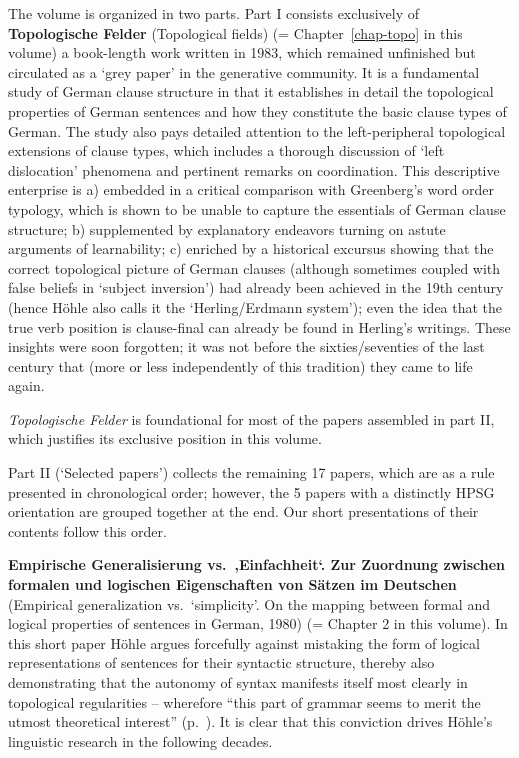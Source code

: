 \begin{refsection}
\medskip
The volume is organized in two parts. Part I consists exclusively of \textbf{Topologische Felder} (Topological fields) (=
Chapter~\ref{chap-topo} in this volume) a book-length work written in 1983, which remained unfinished but circulated as a `grey paper' in the generative community. It is a fundamental study of German clause structure in that it establishes in detail the topological properties of German sentences and how they constitute the basic clause types of German. The study also pays detailed attention to the left-peripheral topological extensions of clause types, which includes a thorough discussion of `left dislocation' phenomena and pertinent remarks on coordination. This descriptive enterprise is a) embedded in a critical comparison with Greenberg's word order typology, which is shown to be unable to capture the essentials of German clause structure; b) supplemented by explanatory endeavors turning on astute arguments of learnability; c) enriched by a historical excursus showing that the correct topological picture of German clauses (although sometimes coupled with false beliefs in `subject inversion') had already been achieved in the 19th century (hence Höhle also calls it the `Herling/Erdmann system'); even the idea that the true verb position is clause-final can already be found in Herling's writings. These insights were soon forgotten; it was not before the sixties/seventies of the last century that (more or less independently of this tradition) they came to life again.

\emph{Topologische Felder} is foundational for most of the papers assembled in part II, which justifies its exclusive position in this volume. 

\medskip
Part II (`Selected papers') collects the remaining 17 papers, which are as a rule
presented in chronological order; however, the 5 papers with a distinctly HPSG orientation are grouped together at the end. Our short presentations of their contents follow this order.  

\textbf{Empirische Generalisierung vs.\ ,Einfachheit‘. Zur Zuordnung zwischen formalen und
  logischen Eigenschaften von Sätzen im Deutschen} (Empirical generalization
vs.\ `simplicity'. On the mapping between formal and logical properties of
sentences in German, 1980) (= Chapter 2 in this volume). In this
short paper Höhle argues forcefully against mistaking the form of logical representations of
sentences for their syntactic structure, thereby also demonstrating that the autonomy of syntax
manifests itself most clearly in topological regularities -- wherefore “this part of grammar seems
to merit the utmost theoretical interest” (p.~\pageref{page-besonderes-theoretisches-interesse}). It is clear that this conviction drives Höhle's linguistic research in the following decades.


\end{refsection}
